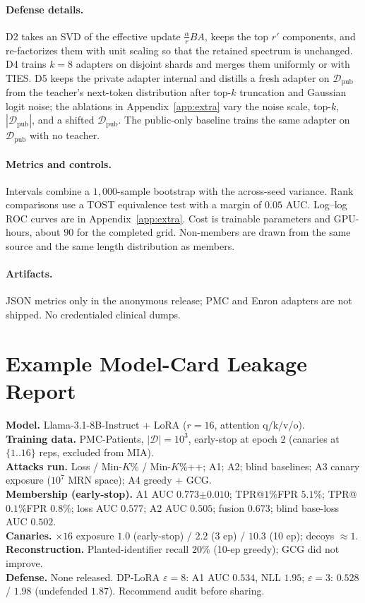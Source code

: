 \documentclass[11pt]{article}
\newcommand{\D}{\mathcal{D}}
\theoremstyle{plain}
\theoremstyle{definition}
\begin{document}
\paragraph{Defense details.}
D2 takes an SVD of the effective update $\tfrac{\alpha}{r}BA$, keeps the top $r'$ components, and re-factorizes them with unit scaling so that the retained spectrum is unchanged.
D4 trains $k{=}8$ adapters on disjoint shards and merges them uniformly or with TIES.
D5 keeps the private adapter internal and distills a fresh adapter on $\D_{\text{pub}}$ from the teacher's next-token distribution after top-$k$ truncation and Gaussian logit noise; the ablations in Appendix~\ref{app:extra} vary the noise scale, top-$k$, $|\D_{\text{pub}}|$, and a shifted $\D_{\text{pub}}$.
The public-only baseline trains the same adapter on $\D_{\text{pub}}$ with no teacher.

\paragraph{Metrics and controls.}
Intervals combine a $1{,}000$-sample bootstrap with the across-seed variance.
Rank comparisons use a TOST equivalence test with a margin of $0.05$ AUC.
Log--log ROC curves are in Appendix~\ref{app:extra}.
Cost is trainable parameters and GPU-hours, about $90$ for the completed grid.
Non-members are drawn from the same source and the same length distribution as members.

\paragraph{Artifacts.}
JSON metrics only in the anonymous release; PMC and Enron adapters are
not shipped. No credentialed clinical dumps.

\section{Example Model-Card Leakage Report}\label{app:card}

\noindent\textbf{Model.} Llama-3.1-8B-Instruct + LoRA ($r{=}16$,
attention q/k/v/o).\\
\textbf{Training data.} PMC-Patients, $|\D|{=}10^3$, early-stop at
epoch $2$ (canaries at $\{1..16\}$ reps, excluded from MIA).\\
\textbf{Attacks run.} Loss / Min-$K$\% / Min-$K$\%++; A1; A2; blind
baselines; A3 canary exposure ($10^7$ MRN space); A4 greedy + GCG.\\
\textbf{Membership (early-stop).} A1 AUC $0.773{\scriptstyle\pm0.010}$;
TPR@$1\%$FPR $5.1\%$; TPR@$0.1\%$FPR $0.8\%$; loss AUC $0.577$;
A2 AUC $0.505$; fusion $0.673$; blind base-loss AUC $0.502$.\\
\textbf{Canaries.} $\times16$ exposure $1.0$ (early-stop) / $2.2$ (3 ep)
/ $10.3$ (10 ep); decoys $\approx1$.\\
\textbf{Reconstruction.} Planted-identifier recall $20\%$ (10-ep greedy);
GCG did not improve.\\
\textbf{Defense.} None released. DP-LoRA $\varepsilon{=}8$: A1 AUC
$0.534$, NLL $1.95$; $\varepsilon{=}3$: $0.528$ / $1.98$ (undefended
$1.87$). Recommend audit before sharing.
\end{document}
